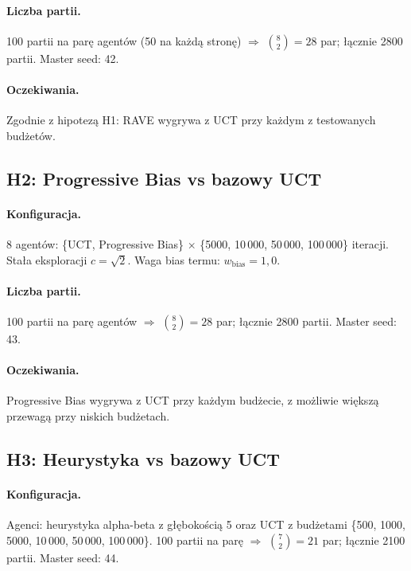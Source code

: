 \paragraph{Liczba partii.} 100 partii na parę agentów (50 na każdą stronę)
$\Rightarrow$ $\binom{8}{2} = 28$ par; łącznie 2800 partii.
Master seed: 42.

\paragraph{Oczekiwania.} Zgodnie z hipotezą H1: RAVE wygrywa z UCT
przy każdym z testowanych budżetów.

\subsection{H2: Progressive Bias vs bazowy UCT}

\paragraph{Konfiguracja.}
8 agentów: \{UCT, Progressive Bias\} $\times$ \{5000, 10\,000, 50\,000, 100\,000\} iteracji.
Stała eksploracji $c = \sqrt{2}$.
Waga bias termu: $w_{\text{bias}} = 1{,}0$.

\paragraph{Liczba partii.} 100 partii na parę agentów
$\Rightarrow$ $\binom{8}{2} = 28$ par; łącznie 2800 partii. Master seed: 43.

\paragraph{Oczekiwania.} Progressive Bias wygrywa z UCT przy każdym budżecie,
z możliwie większą przewagą przy niskich budżetach.

\subsection{H3: Heurystyka vs bazowy UCT}

\paragraph{Konfiguracja.}
Agenci: heurystyka alpha-beta z głębokością 5 oraz UCT z budżetami
\{500, 1000, 5000, 10\,000, 50\,000, 100\,000\}. 100 partii na parę
$\Rightarrow$ $\binom{7}{2} = 21$ par; łącznie 2100 partii.
Master seed: 44.

